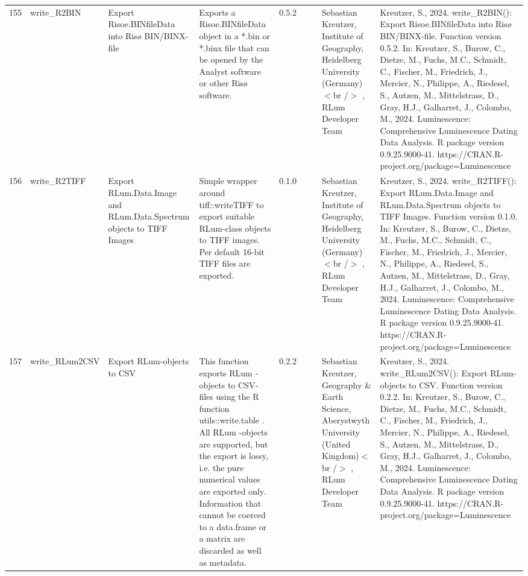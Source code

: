 \begin{table}[ht]
\begin{tabular}{rllllllll}
 \\ 
  155 & write\_R2BIN & Export Risoe.BINfileData into Risø BIN/BINX-file & Exports a  Risoe.BINfileData  object in a  *.bin  or  *.binx  file that can be opened by the Analyst software or other Risø software. & 0.5.2
 &  &  & Sebastian Kreutzer, Institute of Geography, Heidelberg University (Germany)$<$br /$>$ , RLum Developer Team & Kreutzer, S., 2024. write\_R2BIN(): Export Risoe.BINfileData into Risø BIN/BINX-file. Function version 0.5.2. In: Kreutzer, S., Burow, C., Dietze, M., Fuchs, M.C., Schmidt, C., Fischer, M., Friedrich, J., Mercier, N., Philippe, A., Riedesel, S., Autzen, M., Mittelstrass, D., Gray, H.J., Galharret, J., Colombo, M., 2024. Luminescence: Comprehensive Luminescence Dating Data Analysis. R package version 0.9.25.9000-41. https://CRAN.R-project.org/package=Luminescence
 \\ 
  156 & write\_R2TIFF & Export RLum.Data.Image and RLum.Data.Spectrum objects to TIFF Images & Simple wrapper around  tiff::writeTIFF  to export suitable RLum-class objects to TIFF images. Per default 16-bit TIFF files are exported. & 0.1.0
 &  &  & Sebastian Kreutzer, Institute of Geography, Heidelberg University (Germany)$<$br /$>$ , RLum Developer Team & Kreutzer, S., 2024. write\_R2TIFF(): Export RLum.Data.Image and RLum.Data.Spectrum objects to TIFF Images. Function version 0.1.0. In: Kreutzer, S., Burow, C., Dietze, M., Fuchs, M.C., Schmidt, C., Fischer, M., Friedrich, J., Mercier, N., Philippe, A., Riedesel, S., Autzen, M., Mittelstrass, D., Gray, H.J., Galharret, J., Colombo, M., 2024. Luminescence: Comprehensive Luminescence Dating Data Analysis. R package version 0.9.25.9000-41. https://CRAN.R-project.org/package=Luminescence
 \\ 
  157 & write\_RLum2CSV & Export RLum-objects to CSV & This function exports  RLum -objects to CSV-files using the R function utils::write.table . All  RLum -objects are supported, but the export is lossy, i.e. the pure numerical values are exported only. Information that cannot be coerced to a  data.frame  or a  matrix  are discarded as well as metadata. & 0.2.2
 &  &  & Sebastian Kreutzer, Geography \& Earth Science, Aberystwyth University (United Kingdom)$<$br /$>$ , RLum Developer Team & Kreutzer, S., 2024. write\_RLum2CSV(): Export RLum-objects to CSV. Function version 0.2.2. In: Kreutzer, S., Burow, C., Dietze, M., Fuchs, M.C., Schmidt, C., Fischer, M., Friedrich, J., Mercier, N., Philippe, A., Riedesel, S., Autzen, M., Mittelstrass, D., Gray, H.J., Galharret, J., Colombo, M., 2024. Luminescence: Comprehensive Luminescence Dating Data Analysis. R package version 0.9.25.9000-41. https://CRAN.R-project.org/package=Luminescence
 \\ 
   \hline
\end{tabular}
\end{table}

